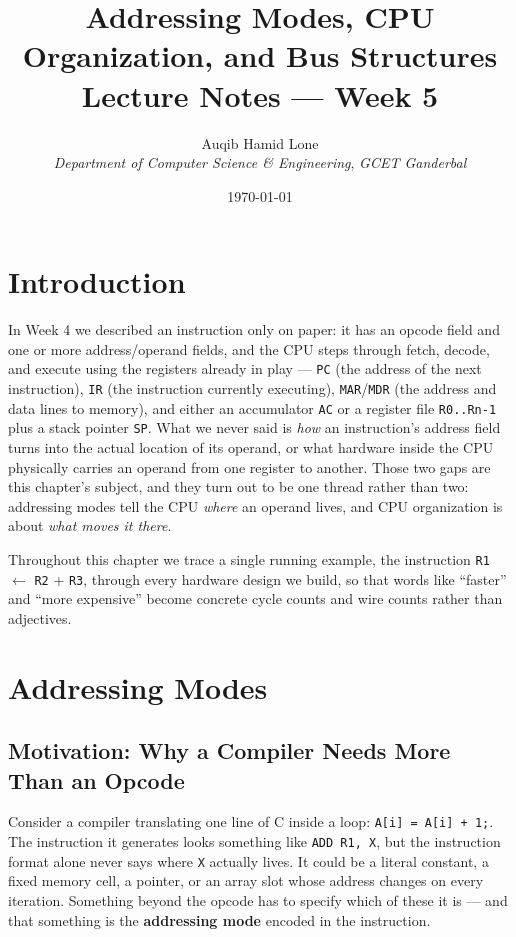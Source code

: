 \documentclass[11pt]{article}
\title{Addressing Modes, CPU Organization, and Bus Structures\\\large Lecture Notes --- Week 5}
\author{Auqib Hamid Lone\\[0.3em]
  \emph{Department of Computer Science \& Engineering}, \emph{GCET Ganderbal}}
\date{\today}
\begin{document}
\maketitle

\section{Introduction}

In Week 4 we described an instruction only on paper: it has an opcode field and one or more address/operand fields, and the CPU steps through fetch, decode, and execute using the registers already in play --- \texttt{PC} (the address of the next instruction), \texttt{IR} (the instruction currently executing), \texttt{MAR}/\texttt{MDR} (the address and data lines to memory), and either an accumulator \texttt{AC} or a register file \texttt{R0..Rn-1} plus a stack pointer \texttt{SP}. What we never said is \emph{how} an instruction's address field turns into the actual location of its operand, or what hardware inside the CPU physically carries an operand from one register to another. Those two gaps are this chapter's subject, and they turn out to be one thread rather than two: addressing modes tell the CPU \emph{where} an operand lives, and CPU organization is about \emph{what moves it there}.

Throughout this chapter we trace a single running example, the instruction \texttt{R1} $\gets$ \texttt{R2} + \texttt{R3}, through every hardware design we build, so that words like ``faster'' and ``more expensive'' become concrete cycle counts and wire counts rather than adjectives.

\section{Addressing Modes}
\label{sec:addressing-modes}

\subsection{Motivation: Why a Compiler Needs More Than an Opcode}

Consider a compiler translating one line of C inside a loop: \texttt{A[i] = A[i] + 1;}. The instruction it generates looks something like \texttt{ADD R1, X}, but the instruction format alone never says where \texttt{X} actually lives. It could be a literal constant, a fixed memory cell, a pointer, or an array slot whose address changes on every iteration. Something beyond the opcode has to specify which of these it is --- and that something is the \textbf{addressing mode} encoded in the instruction.
\end{document}
